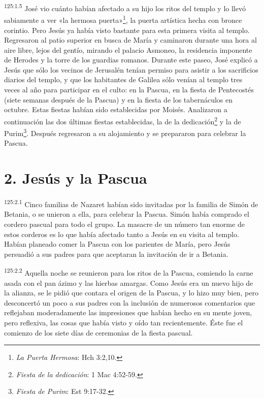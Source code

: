 \par
\textsuperscript{125:1.5} José vio cuánto habían afectado a su hijo los ritos del templo y lo llevó sabiamente a ver «la hermosa puerta»\footnote{\textit{La Puerta Hermosa}: Hch 3:2,10.}, la puerta artística hecha con bronce corintio. Pero Jesús ya había visto bastante para esta primera visita al templo. Regresaron al patio superior en busca de María y caminaron durante una hora al aire libre, lejos del gentío, mirando el palacio Asmoneo, la residencia imponente de Herodes y la torre de los guardias romanos. Durante este paseo, José explicó a Jesús que sólo los vecinos de Jerusalén tenían permiso para asistir a los sacrificios diarios del templo, y que los habitantes de Galilea sólo venían al templo tres veces al año para participar en el culto: en la Pascua, en la fiesta de Pentecostés (siete semanas después de la Pascua) y en la fiesta de los tabernáculos en octubre. Estas fiestas habían sido establecidas por Moisés. Analizaron a continuación las dos últimas fiestas establecidas, la de la dedicación\footnote{\textit{Fiesta de la dedicación}: 1 Mac 4:52-59.} y la de Purim\footnote{\textit{Fiesta de Purim}: Est 9:17-32.}. Después regresaron a su alojamiento y se prepararon para celebrar la Pascua.

\section*{2. Jesús y la Pascua}
\par
\textsuperscript{125:2.1} Cinco familias de Nazaret habían sido invitadas por la familia de Simón de Betania, o se unieron a ella, para celebrar la Pascua. Simón había comprado el cordero pascual para todo el grupo. La masacre de un número tan enorme de estos corderos es lo que había afectado tanto a Jesús en su visita al templo. Habían planeado comer la Pascua con los parientes de María, pero Jesús persuadió a sus padres para que aceptaran la invitación de ir a Betania.

\par
\textsuperscript{125:2.2} Aquella noche se reunieron para los ritos de la Pascua, comiendo la carne asada con el pan ázimo y las hierbas amargas. Como Jesús era un nuevo hijo de la alianza, se le pidió que contara el origen de la Pascua, y lo hizo muy bien, pero desconcertó un poco a sus padres con la inclusión de numerosos comentarios que reflejaban moderadamente las impresiones que habían hecho en su mente joven, pero reflexiva, las cosas que había visto y oído tan recientemente. Éste fue el comienzo de los siete días de ceremonias de la fiesta pascual.

